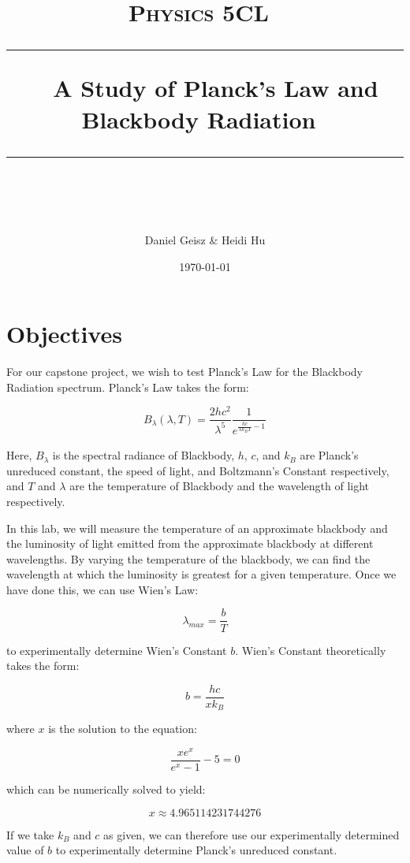 \documentclass{article}
\title{	
	\normalfont\normalsize
	\textsc{ Physics 5CL}\ %
	\vspace{25pt} %
	\rule{\linewidth}{0.5pt}\ %
	{\huge A Study of Planck’s Law and Blackbody Radiation}\ %
	\rule{\linewidth}{2pt}\ %
}
\author{\LARGE Daniel Geisz \& Heidi Hu} %
\date{\normalsize\today}
\begin{document}
\maketitle 
\section{Objectives} %
\label{sec:objectives}	
For our capstone project, we wish to test Planck’s Law for the Blackbody Radiation spectrum.  Planck's Law takes the form:

$$B_\lambda (\lambda, T) = \frac{2hc^2}{\lambda ^5}\frac{1}{e _{}^{\frac{hc}{\lambda k_B T} - 1}}$$

Here, $B_{\lambda}$ is the spectral radiance of Blackbody, $\displaystyle h$, $c$, and $k_B$ are Planck's unreduced constant, the speed of light, and Boltzmann's Constant respectively, and $T$ and $\lambda$ are the temperature of Blackbody and the wavelength of light respectively.


In this lab, we will measure the temperature of an approximate blackbody and the luminosity of light emitted from the approximate blackbody at different wavelengths.   By varying the temperature of the blackbody, we can find the wavelength at which the luminosity is greatest for a given temperature. Once we have done this, we can use Wien's Law:

$$\lambda_{max} = \frac{b}{T}$$

to experimentally determine Wien's Constant $b$.  Wien's Constant theoretically takes the form:

$$b = \frac{hc}{xk_B}$$

where $x$ is the solution to the equation:

$$\frac{xe^x}{e^x - 1} - 5 = 0$$

which can be numerically solved to yield:

$$x \approx 4.965114231744276$$

If we take $k_B$ and $c$ as given, we can therefore use our experimentally determined value of $b$ to experimentally determine Planck's unreduced constant.
 
\end{document}
